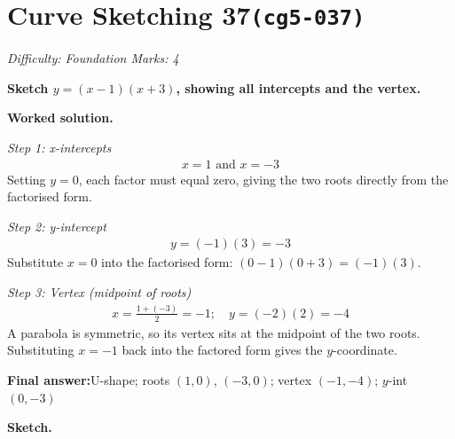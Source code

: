 \documentclass[11pt]{article}
\newcommand{\question}[1]{\par\medskip\noindent\textbf{#1}\par}
\begin{document}
\section*{Curve Sketching 37\quad\small\texttt{(cg5-037)}}
\textit{Difficulty: Foundation \quad\textbar\quad Marks: 4}

\question{Sketch \( y = (x-1)(x+3) \), showing all intercepts and the vertex.}

\textbf{Worked solution.}

\textit{Step 1: x-intercepts}
\[\begin{gathered}
x = 1 \text{ and } x = -3
\end{gathered}\]
Setting \( y = 0 \), each factor must equal zero, giving the two roots directly from the factorised form.

\textit{Step 2: y-intercept}
\[\begin{gathered}
y = (-1)(3) = -3
\end{gathered}\]
Substitute \( x = 0 \) into the factorised form: \( (0-1)(0+3) = (-1)(3) \).

\textit{Step 3: Vertex (midpoint of roots)}
\[\begin{gathered}
x = \frac{1+(-3)}{2} = -1; \quad y = (-2)(2) = -4
\end{gathered}\]
A parabola is symmetric, so its vertex sits at the midpoint of the two roots. Substituting \( x = -1 \) back into the factored form gives the \( y \)-coordinate.

\begin{answerbox}
\textbf{Final answer:}\quad U-shape; roots \(\displaystyle (1,0)\), \(\displaystyle (-3,0)\); vertex \(\displaystyle (-1,-4)\); \(\displaystyle y\)-int \(\displaystyle (0,-3)\)
\end{answerbox}
\textbf{Sketch.}
\end{document}
